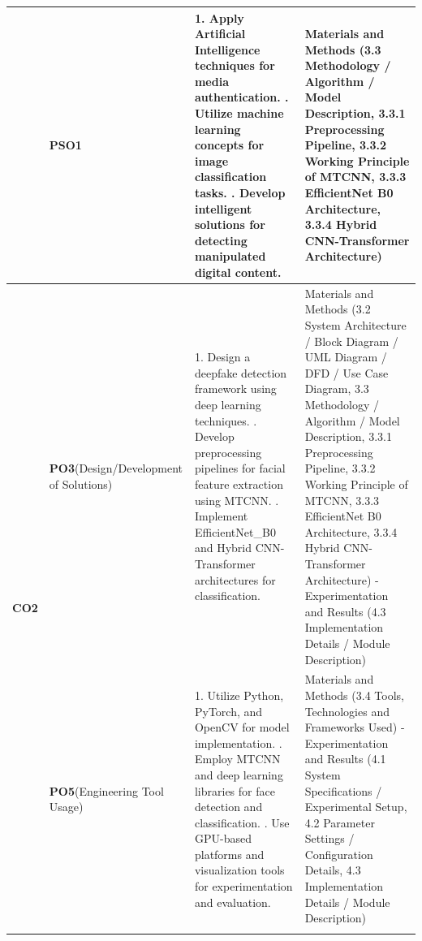 \documentclass[12pt,a4paper]{report}
\begin{document}
\begin{longtable}{|c|p{2.5cm}|p{7.5cm}|p{4.0cm}|}
& {\textbf{PSO1}}
& 1. Apply Artificial Intelligence techniques for media authentication.
  \newline 2. Utilize machine learning concepts for image classification tasks.
  \newline 3. Develop intelligent solutions for detecting manipulated digital content.
& Materials and Methods (3.3 Methodology / Algorithm / Model Description, 3.3.1 Preprocessing Pipeline, 3.3.2 Working Principle of MTCNN, 3.3.3 EfficientNet B0 Architecture, 3.3.4 Hybrid CNN-Transformer Architecture) \\ \hline
\multirow{3}{*}{\textbf{CO2}}
& {\textbf{PO3}\newline(Design/Development of Solutions)}
& 1. Design a deepfake detection framework using deep learning techniques.
  \newline 2. Develop preprocessing pipelines for facial feature extraction using MTCNN.
  \newline 3. Implement EfficientNet\_B0 and Hybrid CNN-Transformer architectures for classification.
& Materials and Methods (3.2 System Architecture / Block Diagram / UML Diagram / DFD / Use Case Diagram, 3.3 Methodology / Algorithm / Model Description, 3.3.1 Preprocessing Pipeline, 3.3.2 Working Principle of MTCNN, 3.3.3 EfficientNet B0 Architecture, 3.3.4 Hybrid CNN-Transformer Architecture) -Experimentation and Results (4.3 Implementation Details / Module Description) \\ \cline{2-4}

& {\textbf{PO5}\newline(Engineering Tool Usage)}
& 1. Utilize Python, PyTorch, and OpenCV for model implementation.
  \newline 2. Employ MTCNN and deep learning libraries for face detection and classification.
  \newline 3. Use GPU-based platforms and visualization tools for experimentation and evaluation.
& Materials and Methods (3.4 Tools, Technologies and Frameworks Used) -Experimentation and Results (4.1 System Specifications / Experimental Setup, 4.2 Parameter Settings / Configuration Details, 4.3 Implementation Details / Module Description) \\ \cline{2-4}


\end{longtable}
\end{document}
